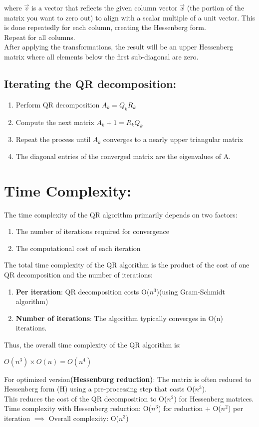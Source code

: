 \documentclass{article}
\begin{document}
where $\vec{v}$ is a vector that reflects the given column vector $\vec{x}$ (the portion of the matrix you want to zero out) to align with a scalar multiple of a unit vector. This is done repeatedly for each column, creating the Hessenberg form.\\
Repeat for all columns.\\
After applying the transformations, the result will be an upper Hessenberg matrix where all elements below the first sub-diagonal are zero.\\


\subsection{Iterating the QR decomposition:}
\begin{enumerate}
    \item Perform QR decomposition $A_k=Q_kR_k$
    \item Compute the next matrix $A_k+1=R_kQ_k$
    \item Repeat the process until $A_k$ converges to a nearly upper triangular matrix 
    \item The diagonal entries of the converged matrix are the eigenvalues of A.
\end{enumerate}
\section{Time Complexity:}
The time complexity of the QR algorithm primarily depends on two factors:
\begin{enumerate}
    \item The number of iterations required for convergence
    \item The computational cost of each iteration
\end{enumerate}
The total time complexity of the QR algorithm is the product of the cost of one QR decomposition and the number of iterations:
\begin{enumerate}
    \item \textbf{Per iteration}: QR decomposition costs O($n^3$)(using Gram-Schmidt algorithm)
    \item \textbf{Number of iterations}: The algorithm typically converges in O(n) iterations.
\end{enumerate}
Thus, the overall time complexity of the QR algorithm is:
\begin{center}
    $O(n^3)\times O(n)=O(n^4)$
\end{center}
For optimized version\textbf{(Hessenburg reduction)}:
The matrix is often reduced to Hessenberg form (H) using a pre-processing step that costs O($n^3$).\\This reduces the cost of the QR decomposition to O($n^2$) for Hessenberg matrices.\\
Time complexity with Hessenberg reduction: O($n^3$) for reduction + O($n^2$) per iteration $\implies$ Overall complexity: O($n^3$)
\end{document}
